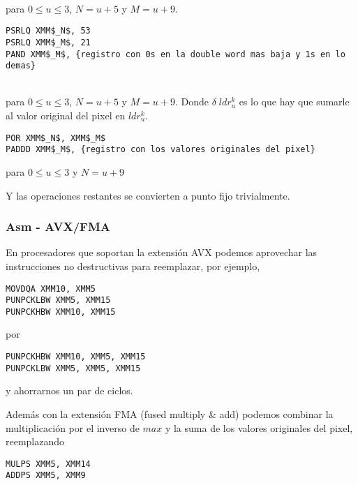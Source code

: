   \\
para $0 \le u \le 3$, $N = u+5$ y $M = u+9$.

\begin{lstlisting}
PSRLQ XMM$_N$, 53
PSRLQ XMM$_M$, 21
PAND XMM$_M$, {registro con 0s en la double word mas baja y 1s en lo demas}
\end{lstlisting}

 

  \\
para $0 \le u \le 3$, $N = u+5$ y $M = u+9$. Donde $\delta \; ldr^k_u$ es lo que hay que sumarle al valor original del pixel en $ldr^k_u$.

\begin{lstlisting}
POR XMM$_N$, XMM$_M$
PADDD XMM$_M$, {registro con los valores originales del pixel}
\end{lstlisting}

 
para $0 \le u \le 3$ y $N = u+9$

Y las operaciones restantes se convierten a punto fijo trivialmente.

\subsubsection{Asm - AVX/FMA}

En procesadores que soportan la extensión AVX podemos aprovechar las instrucciones no destructivas para reemplazar, por ejemplo,

\begin{lstlisting}
MOVDQA XMM10, XMM5
PUNPCKLBW XMM5, XMM15
PUNPCKHBW XMM10, XMM15
\end{lstlisting}

por

\begin{lstlisting}
PUNPCKHBW XMM10, XMM5, XMM15
PUNPCKLBW XMM5, XMM5, XMM15
\end{lstlisting}

y ahorrarnos un par de ciclos.

Además con la extensión FMA (fused multiply \& add) podemos combinar la multiplicación por el inverso de $max$ y la suma de los valores originales del pixel, reemplazando

\begin{lstlisting}
MULPS XMM5, XMM14
ADDPS XMM5, XMM9
\end{lstlisting}

